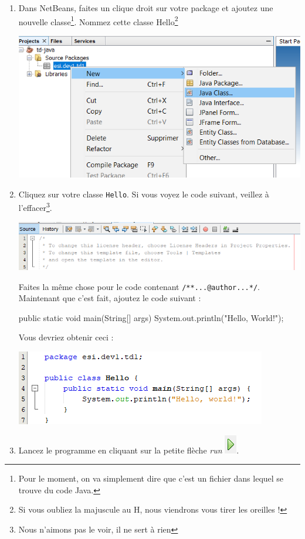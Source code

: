 \documentclass[a4paper,11pt]{article}
\begin{document}
\begin{enumerate}
		\item Dans NetBeans, faites un clique droit sur votre package et ajoutez une nouvelle classe\footnote{Pour le moment, on va simplement dire que c'est un fichier dans lequel se trouve du code Java.}. Nommez cette classe {Hello}\footnote{Si vous oubliez la majuscule au H, nous viendrons vous tirer les oreilles !}
			\begin{center}
				\includegraphics[width=\textwidth]{NetBeans/nb_newproject_new_class}
			\end{center}


		\item Cliquez sur votre classe \texttt{Hello}. Si vous voyez le code suivant, veillez à l'effacer\footnote{Nous n'aimons pas le voir, il ne sert à rien}. 
			\begin{center}
				\includegraphics[width=\textwidth]{NetBeans/nb_newproject_header}
			\end{center}
			Faites la même chose pour le code contenant \texttt{/**...@author...*/}.
			Maintenant que c'est fait, ajoutez le code suivant :
\begin{Java}
	public static void main(String[] args) {
		System.out.println("Hello, World!");
	}
\end{Java}
			Vous devriez obtenir ceci :
			\begin{center}
				\includegraphics{NetBeans/nb_newproject_code}
			\end{center}
		\item Lancez le programme en cliquant sur la petite flèche \emph{run} \includegraphics{NetBeans/nb_newproject_run}.


\end{enumerate}
\end{document}
